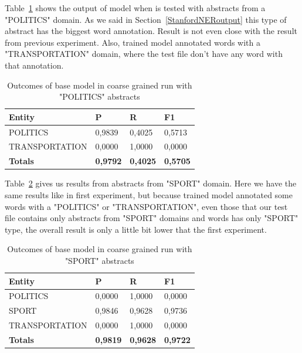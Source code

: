 \documentclass[thesis=M,english]{FITthesis}[2018/05/30]
\begin{document}
	Table~\ref{table:All3domainsWithPoliticsTop300Coarse} shows the output of model when is tested with abstracts from a "POLITICS" domain. As we said in Section~\ref{StanfordNERoutput} this type of abstract has the biggest word annotation. Result is not even close with the result from previous experiment. Also, trained model annotated words with a "TRANSPORTATION" domain, where the test file don't have any word with that annotation. 
	
	\begin{table}[H]\centering
		\begin{tabular}{|l|l|l|l|}
			\hline {\textbf{Entity}} & {\textbf{P}} & {\textbf{R}} & {\textbf{F1}}\\\hline
				POLITICS & 0,9839 & 0,4025 & 0,5713\\
				TRANSPORTATION & 0,0000 & 1,0000 & 0,0000\\\hline
				\textbf{Totals} & \textbf{0,9792} & \textbf{0,4025} & \textbf{0,5705}\\\hline
		\end{tabular}
		\caption{Outcomes of base model in coarse grained run with "POLITICS" abstracts\label{table:All3domainsWithPoliticsTop300Coarse}}
	\end{table}	
	
	Table~\ref{table:All3domainsWithSportTop300Coarse} gives us results from abstracts from "SPORT" domain. Here we have the same results like in first experiment, but because trained model annotated some words with a "POLITICS" or "TRANSPORTATION", even those that our test file contains only abstracts from "SPORT" domains and words has only "SPORT" type, the overall result is only a little bit lower that the first experiment.

	\begin{table}[H]\centering
		\begin{tabular}{|l|l|l|l|}
			\hline {\textbf{Entity}} & {\textbf{P}} & {\textbf{R}} & {\textbf{F1}}\\\hline
				POLITICS & 0,0000 & 1,0000 & 0,0000\\
				SPORT & 0,9846 & 0,9628 & 0,9736\\
				TRANSPORTATION & 0,0000 & 1,0000 & 0,0000\\\hline
				\textbf{Totals} & \textbf{0,9819} & \textbf{0,9628} & \textbf{0,9722}\\\hline
		\end{tabular}
		\caption{Outcomes of base model in coarse grained run with "SPORT" abstracts \label{table:All3domainsWithSportTop300Coarse}}
	\end{table}	
	
\end{document}
